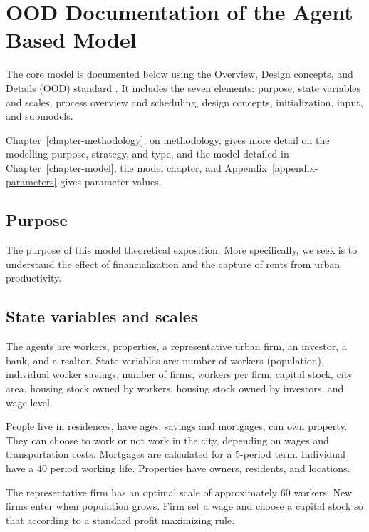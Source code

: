 \chapter{OOD Documentation of the Agent Based Model} \label{appendix-odd}
The core model is documented below using the Overview, Design concepts, and Details (OOD) standard \cite{grimmODDProtocolDescribing2020, grimmODDProtocolReview2010a}. It includes the seven elements: purpose, state variables and scales, process overview and scheduling, design concepts, initialization, input, and submodels. 

Chapter~\ref{chapter-methodology}, on methodology, gives more detail on the modelling purpose, strategy, and type, and the model detailed in Chapter~\ref{chapter-model}, the model chapter, and Appendix~\ref{appendix-parameters} gives parameter values.


\section{Purpose}
The purpose of this model \gls{theoretical exposition}. More specifically, we seek is to understand the effect of financialization and the capture of rents from urban productivity. %



\section{State variables and scales}
The agents are workers,  %
properties, a representative urban firm, an investor, a bank, and a realtor. 
State variables are: number of workers (population), individual worker savings, number of firms, workers per firm, capital stock, city area, housing stock owned by workers, housing stock owned by investors, and wage level.

People live in residences, have ages, savings and mortgages, can own property. They can choose to work or not work in the city, depending on wages and transportation costs. Mortgages are calculated for a 5-period term. Individual have a 40 period working life. Properties have owners, residents, and locations. 

The representative firm has an optimal scale of approximately 60 workers. New firms enter when population grows. Firm set a wage and choose a capital stock so that according to a standard profit maximizing rule.

